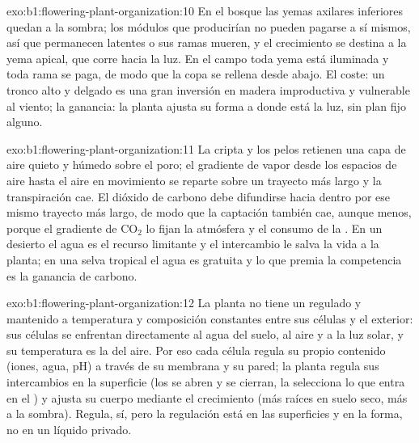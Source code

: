 \begin{solution}{exo:b1:flowering-plant-organization:10}
En el bosque las yemas axilares inferiores quedan a la sombra; los módulos
que producirían no pueden pagarse a sí mismos, así que permanecen latentes o
sus ramas mueren, y el crecimiento se destina a la yema apical, que corre
hacia la luz. En el campo toda yema está iluminada y toda rama se paga, de
modo que la copa se rellena desde abajo. El coste: un tronco alto y delgado
es una gran inversión en madera improductiva y vulnerable al viento; la
ganancia: la planta ajusta su forma a donde está la luz, sin plan fijo
alguno.
\end{solution}

\begin{solution}{exo:b1:flowering-plant-organization:11}
La cripta y los pelos retienen una capa de aire quieto y húmedo sobre el
poro; el gradiente de vapor desde los espacios de aire hasta el aire en
movimiento se reparte sobre un trayecto más largo y la transpiración cae. El
dióxido de carbono debe difundirse hacia dentro por ese mismo trayecto más
largo, de modo que la captación también cae, aunque menos, porque el
gradiente de $\mathrm{CO_2}$ lo fijan la atmósfera y el consumo de la .
En un desierto el agua es el recurso limitante y el intercambio le salva la
vida a la planta; en una selva tropical el agua es gratuita y lo que premia
la competencia es la ganancia de carbono.
\end{solution}

\begin{solution}{exo:b1:flowering-plant-organization:12}
La planta no tiene un  regulado y mantenido a
temperatura y composición constantes entre sus células y el exterior: sus
células se enfrentan directamente al agua del suelo, al aire y a la luz
solar, y su temperatura es la del aire. Por eso cada célula regula su propio
contenido (iones, agua, pH) a través de su membrana y su pared; la planta
regula sus intercambios en la superficie (los  se abren y se cierran,
la  selecciona lo que entra en el ) y ajusta su cuerpo
mediante el crecimiento (más raíces en suelo seco, más  a la sombra).
Regula, sí, pero la regulación está en las superficies y en la forma, no en
un líquido privado.
\end{solution}

